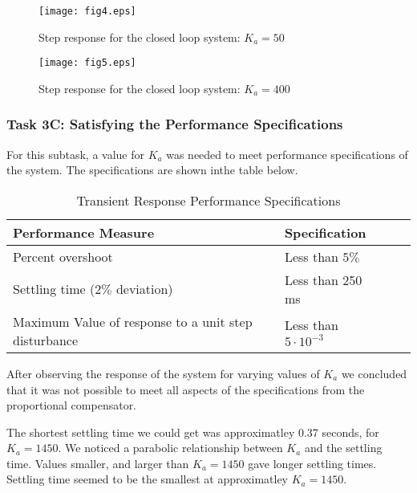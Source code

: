 \documentclass{article}
\newcommand{\matlab}[1]{%
%
}
\begin{document}
\begin{figure}[H]
  \caption{Step response for the closed loop system: $K_a = 50$}
  \centering
  \texttt{[image: fig4.eps]}
\end{figure}

\matlab{fig5.m}

\begin{figure}[H]
  \caption{Step response for the closed loop system: $K_a = 400$}
  \centering
  \texttt{[image: fig5.eps]}
\end{figure}

\subsubsection*{Task 3C: Satisfying the Performance Specifications}

For this subtask, a value for $K_a$ was needed to meet performance 
specifications of the system. The specifications are shown inthe table below.

\begin{table}[H]
\begin{center}
  \begin{tabular}{ | l | l | l | p{5cm} |}
  \hline
  \textbf{Performance Measure} & \textbf{Specification}\\ \hline 
  Percent overshoot & Less than $5\%$ \\ \hline 
  Settling time ($2\%$ deviation) & Less than 250 ms \\ \hline 
  Maximum Value of response to a unit step disturbance & Less than 
  $5\cdot10^{-3}$ \\ \hline 
 \end{tabular}
\end{center}
\caption{Transient Response Performance Specifications}
\end{table}

After observing the response of the system for varying values of $K_a$ we
concluded that it was not possible to meet all aspects of the specifications
from the proportional compensator. 

The shortest settling time we could get was approximatley 0.37 seconds, for
$K_a = 1450$. We noticed a parabolic relationship between $K_a$ and the
settling time. Values smaller, and larger than $K_a = 1450$ gave longer
settling times. Settling time seemed to be the smallest at approximatley
$K_a = 1450$.

\matlab{fig6.m}
\end{document}
